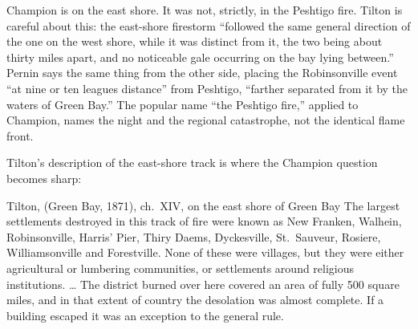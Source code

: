 Champion is on the east shore. It was not, strictly, in the Peshtigo
fire. Tilton is careful about this: the east-shore firestorm ``followed
the same general direction of the one on the west shore, while it was
distinct from it, the two being about thirty miles apart, and no
noticeable gale occurring on the bay lying between.'' Pernin says the
same thing from the other side, placing the Robinsonville event ``at
nine or ten leagues distance'' from Peshtigo, ``farther separated from
it by the waters of Green Bay.'' The popular name ``the Peshtigo
fire,'' applied to Champion, names the night and the regional
catastrophe, not the identical flame front.

Tilton's description of the east-shore track is where the Champion
question becomes sharp:

\begin{witnesstext}{Tilton,  (Green Bay, 1871), ch.~XIV, on the east shore of Green Bay}
The largest settlements destroyed in this track of fire were known as
New Franken, Walhein, Robinsonville, Harris' Pier, Thiry Daems,
Dyckesville, St.~Sauveur, Rosiere, Williamsonville and Forestville.
None of these were villages, but they were either agricultural or
lumbering communities, or settlements around religious institutions.
\dots{} The district burned over here covered an area of fully 500
square miles, and in that extent of country the desolation was almost
complete. If a building escaped it was an exception to the general
rule.
\end{witnesstext}


